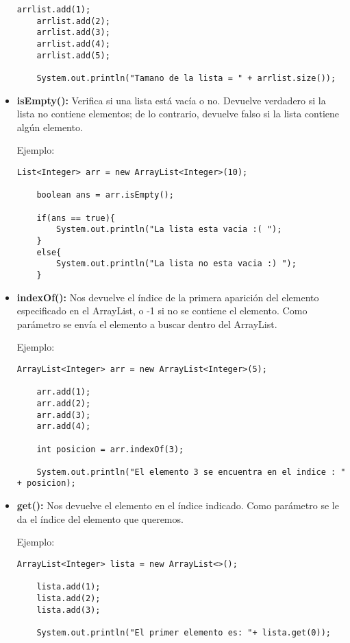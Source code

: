 \documentclass[12pt, letterpaper]{article} %
\begin{document}
\begin{itemize}
\begin{lstlisting}[frame=single]
    arrlist.add(1);
    arrlist.add(2);
    arrlist.add(3);
    arrlist.add(4);
    arrlist.add(5);

    System.out.println("Tamano de la lista = " + arrlist.size());
    \end{lstlisting}
    
    \item \textbf{isEmpty():} Verifica si una lista está vacía o no. Devuelve verdadero si la lista no contiene elementos; de lo contrario, devuelve falso si la lista contiene algún elemento.
    
    Ejemplo:
    \lstset{language = Java, breaklines=true, basicstyle=\footnotesize}
    \begin{lstlisting}[frame=single]
    List<Integer> arr = new ArrayList<Integer>(10);
    
    boolean ans = arr.isEmpty();
    
    if(ans == true){
        System.out.println("La lista esta vacia :( ");
    }
    else{
    	System.out.println("La lista no esta vacia :) ");
    }
    \end{lstlisting}

    \item \textbf{indexOf():} Nos devuelve el índice de la primera aparición del elemento especificado en el ArrayList, o -1 si no se contiene el elemento. Como parámetro se envía el elemento a buscar dentro del ArrayList.
    
    Ejemplo:
    \lstset{language = Java, breaklines=true, basicstyle=\footnotesize}
    \begin{lstlisting}[frame=single]
    ArrayList<Integer> arr = new ArrayList<Integer>(5);

    arr.add(1);
    arr.add(2);
    arr.add(3);
    arr.add(4);

    int posicion = arr.indexOf(3);

    System.out.println("El elemento 3 se encuentra en el indice : " + posicion);
    \end{lstlisting}

    \item \textbf{get():} Nos devuelve el elemento en el índice indicado. Como parámetro se le da el índice del elemento que queremos.
    
    Ejemplo:
    \lstset{language = Java, breaklines=true, basicstyle=\footnotesize}
    \begin{lstlisting}[frame=single]
    ArrayList<Integer> lista = new ArrayList<>();

    lista.add(1);
    lista.add(2);
    lista.add(3);

    System.out.println("El primer elemento es: "+ lista.get(0));
    \end{lstlisting}
\end{itemize}
\vspace{30mm}
\end{document}
